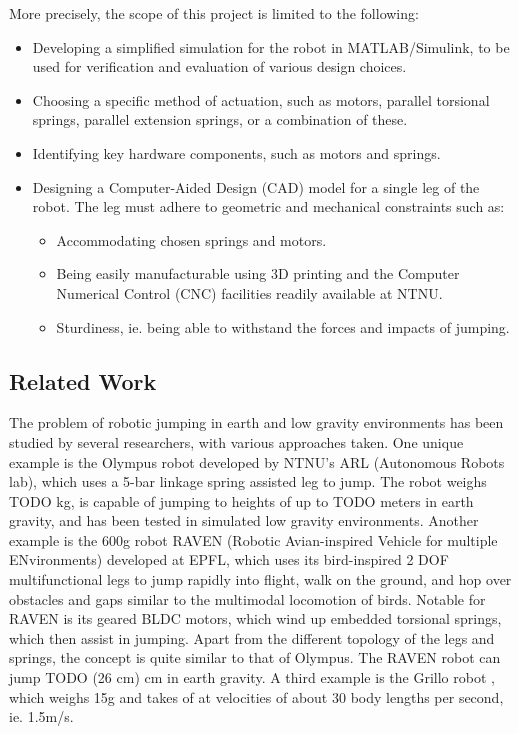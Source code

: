 More precisely, the scope of this project is limited to the following:
\begin{itemize}
    \item Developing a simplified simulation for the robot in MATLAB/Simulink, to be used for verification and evaluation of various design choices. 
    \item Choosing a specific method of actuation, such as motors, parallel torsional springs, parallel extension springs, or a combination of these.
    \item Identifying key hardware components, such as motors and springs. 
    \item Designing a Computer-Aided Design (CAD) model for a single leg of the robot. The leg must adhere to geometric and mechanical constraints such as:
    \begin{itemize}
    \item Accommodating chosen springs and motors. 
    \item Being easily manufacturable using 3D printing and the Computer Numerical Control (CNC) facilities readily available at NTNU.
    \item Sturdiness, ie. being able to withstand the forces and impacts of jumping. 
    \end{itemize}
\end{itemize}

\subsection{Related Work}
\label{sec:related_work}

The problem of robotic jumping in earth and low gravity environments has been studied by several researchers, with various approaches taken. One unique example is the Olympus robot \cite{OLYMPUS1} \cite{OLYMPUS2} developed by NTNU's ARL (Autonomous Robots lab), which uses a 5-bar linkage spring assisted leg to jump. The robot weighs TODO kg, is capable of jumping to heights of up to TODO meters in earth gravity, and has been tested in simulated low gravity environments. Another example is the 600g robot RAVEN (Robotic Avian-inspired Vehicle for multiple ENvironments) \cite{RAVEN} developed at EPFL, which uses its bird-inspired 2 DOF multifunctional legs to jump rapidly into flight, walk on the ground, and hop over obstacles and gaps similar to the multimodal locomotion of birds. Notable for RAVEN is its geared BLDC motors, which wind up embedded torsional springs, which then assist in jumping. Apart from the different topology of the legs and springs, the concept is quite similar to that of Olympus. The RAVEN robot can jump TODO (26 cm) cm in earth gravity. A third example is the Grillo robot \cite{GRILLO}, which weighs 15g and takes of at velocities of about 30 body lengths per second, ie. 1.5m/s. 


